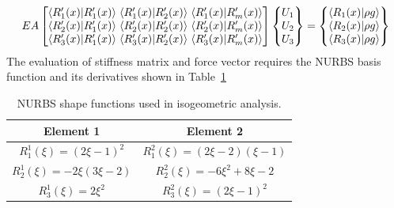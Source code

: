 \documentclass[submit,12pt]{aiaa-pretty} %
\begin{document}
\begin{equation}\nonumber
  \setlength\arraycolsep{1.5pt}
                        {EA}
                        \begin{bmatrix}
                          \left \langle {\color{black}{R_1^\prime(x)}} \vert {\color{black}{R_1^\prime(x)}} \right \rangle &  \left \langle {\color{black}{R_1^\prime(x)}} \vert {\color{black}{R_2^\prime(x)}} \right \rangle & \left \langle {\color{black}{R_1^\prime(x)}} \vert {\color{black}{R_m^\prime(x)}} \right \rangle \\
                          \left \langle {\color{black}{R_2^\prime(x)}} \vert {\color{black}{R_1^\prime(x)}} \right \rangle &  \left \langle {\color{black}{R_2^\prime(x)}} \vert {\color{black}{R_2^\prime(x)}} \right \rangle & \left \langle {\color{black}{R_2^\prime(x)}} \vert {\color{black}{R_m^\prime(x)}} \right \rangle \\
                          \left \langle {\color{black}{R_3^\prime(x)}} \vert {\color{black}{R_1^\prime(x)}} \right \rangle &  \left \langle {\color{black}{R_3^\prime(x)}} \vert {\color{black}{R_2^\prime(x)}} \right \rangle & \left \langle {\color{black}{R_3^\prime(x)}} \vert {\color{black}{R_m^\prime(x)}} \right \rangle \\
                        \end{bmatrix}
                        \begin{Bmatrix}
                          U_1 \\
                          U_2 \\
                          U_3 \\
                        \end{Bmatrix}=
                        \begin{Bmatrix}
                          \left \langle {\color{black}{R_1(x)}} \vert {\color{black}{\rho g}} \right \rangle \\
                          \left \langle {\color{black}{R_2(x)}} \vert {\color{black}{\rho g}} \right \rangle \\
                          \left \langle {\color{black}{R_3(x)}} \vert {\color{black}{\rho g}} \right \rangle \\ 
                        \end{Bmatrix}    
\end{equation}
The evaluation of stiffness matrix and force vector requires the NURBS
basis function and its derivatives shown in
Table~\ref{tab:anlytical-form-of-nurbs-functions}
\begin{table}
  \centering
  \caption{NURBS shape functions used in isogeometric analysis.}
  \label{tab:anlytical-form-of-nurbs-functions}
  \begin{tabular}{cc}
    \hline
    Element 1 & Element 2 \\
    \hline
    $R_1^1(\xi) =  (2 \xi -1)^2$ & $R_1^2(\xi) = (2\xi-2)(\xi-1)$  \\
    $R_2^1(\xi) = -2\xi(3\xi-2)$ & $R_2^2(\xi) = -6\xi^2 + 8\xi -2$ \\
    $R_3^1(\xi) =  2\xi^2$       & $R_3^2(\xi) = (2\xi -1)^2$ \\
    \hline
  \end{tabular}
\end{table}
\end{document}
